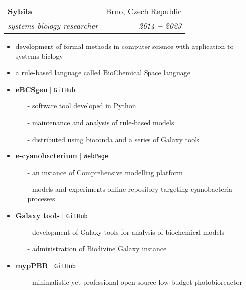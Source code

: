 \documentclass[letterpaper,11pt]{article}
\makeatletter
\newcommand{\resumeSubheading}[4]{
  \vspace{-2pt}\item
    \begin{tabular*}{0.97\textwidth}[t]{l@{\extracolsep{\fill}}r}
      \textbf{#1} & #2 \\
      \textit{\small#3} & \textit{\small #4} \\
    \end{tabular*}\vspace{-7pt}
}
\makeatother
\begin{document}
  \resumeSubheading
  {\href{https://sybila.fi.muni.cz/}{Sybila}}{Brno, Czech Republic}
  {systems biology researcher}{2014 \textbf{--} 2023}
  \small{
    \begin{itemize}
      \item development of formal methods in computer science with application to systems biology \vspace{-2pt}
      \item a rule-based language called BioChemical Space language \vspace{2pt}
      \item \textbf{eBCSgen} $|$ \href{https://github.com/sybila/eBCSgen}{\color{blue}\texttt{GitHub}} \vspace{-2pt}
      \begin{itemize}
        \item[-] software tool developed in Python \vspace{-2pt}
        \item[-] maintenance and analysis of rule-based models \vspace{-2pt}
        \item[-] distributed using bioconda and a series of Galaxy tools
      \end{itemize}
      \item \textbf{e-cyanobacterium} $|$ \href{https://www.e-cyanobacterium.org/}{\color{blue}\texttt{WebPage}} \vspace{-2pt}
      \begin{itemize}
        \item[-] an instance of Comprehensive modelling platform \vspace{-2pt}
        \item[-] models and experiments online repository targeting cyanobacteria processes \vspace{-2pt}
      \end{itemize}
      \item \textbf{Galaxy tools} $|$ \href{https://github.com/sybila/galaxytools}{\color{blue}\texttt{GitHub}} \vspace{-2pt}
      \begin{itemize}
        \item[-] development of Galaxy tools for analysis of biochemical models \vspace{-2pt}
        \item[-] administration of \href{https://biodivine-vm.fi.muni.cz/galaxy}{Biodivine} Galaxy instance \vspace{-2pt}
      \end{itemize}
      \item \textbf{mypPBR} $|$ \href{https://github.com/xtrojak/bioreactor}{\color{blue}\texttt{GitHub}} \vspace{-2pt}
      \begin{itemize}
        \item[-] minimalistic yet professional open-source low-budget photobioreactor \vspace{-2pt}
      \end{itemize}
    \end{itemize}
  }
\end{document}
